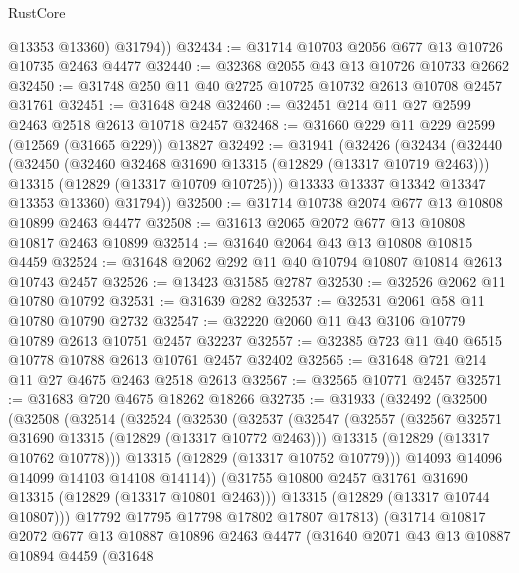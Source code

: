 \begin{lexlean}{RustCore}
\begin{coremodule}
          @13353
          @13360)
        @31794))
@32434 := @31714 @10703 @2056 @677 @13 @10726 @10735 @2463 @4477
@32440 := @32368 @2055 @43 @13 @10726 @10733 @2662
@32450 := @31748 @250 @11 @40 @2725 @10725 @10732 @2613 @10708 @2457 @31761
@32451 := @31648 @248
@32460 := @32451 @214 @11 @27 @2599 @2463 @2518 @2613 @10718 @2457
@32468 := @31660 @229 @11 @229 @2599 (@12569 (@31665 @229)) @13827
@32492 := @31941
    (@32426
      (@32434
        (@32440
          (@32450
            (@32460 @32468 @31690 @13315 (@12829 (@13317 @10719 @2463)))
            @13315
            (@12829 (@13317 @10709 @10725)))
          @13333
          @13337
          @13342
          @13347
          @13353
          @13360)
        @31794))
@32500 := @31714 @10738 @2074 @677 @13 @10808 @10899 @2463 @4477
@32508 := @31613 @2065 @2072 @677 @13 @10808 @10817 @2463 @10899
@32514 := @31640 @2064 @43 @13 @10808 @10815 @4459
@32524 := @31648 @2062 @292 @11 @40 @10794 @10807 @10814 @2613 @10743 @2457
@32526 := @13423 @31585 @2787
@32530 := @32526 @2062 @11 @10780 @10792
@32531 := @31639 @282
@32537 := @32531 @2061 @58 @11 @10780 @10790 @2732
@32547 := @32220 @2060 @11 @43 @3106 @10779 @10789 @2613 @10751 @2457 @32237
@32557 := @32385 @723 @11 @40 @6515 @10778 @10788 @2613 @10761 @2457 @32402
@32565 := @31648 @721 @214 @11 @27 @4675 @2463 @2518 @2613
@32567 := @32565 @10771 @2457
@32571 := @31683 @720 @4675 @18262 @18266
@32735 := @31933
    (@32492
      (@32500
        (@32508
          (@32514
            (@32524
              (@32530
                (@32537
                  (@32547
                    (@32557
                      (@32567 @32571 @31690 @13315 (@12829 (@13317 @10772 @2463)))
                      @13315
                      (@12829 (@13317 @10762 @10778)))
                    @13315
                    (@12829 (@13317 @10752 @10779)))
                  @14093
                  @14096
                  @14099
                  @14103
                  @14108
                  @14114))
              (@31755 @10800 @2457 @31761 @31690 @13315 (@12829 (@13317 @10801 @2463)))
              @13315
              (@12829 (@13317 @10744 @10807)))
            @17792
            @17795
            @17798
            @17802
            @17807
            @17813)
          (@31714
            @10817
            @2072
            @677
            @13
            @10887
            @10896
            @2463
            @4477
            (@31640
              @2071
              @43
              @13
              @10887
              @10894
              @4459
              (@31648

\end{coremodule}
\end{lexlean}
